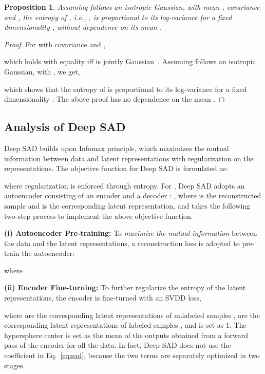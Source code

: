 \documentclass{bmvc2k}
\newtheorem{proposition}{Proposition}
\newtheorem{proof}{Proof}
\begin{document}
\begin{proposition}
Assuming  follows an isotropic Gaussian, with mean , covariance  and , the entropy of , \emph{i.e.}, , is proportional to its log-variance for a fixed dimensionality , without dependence on its mean .
\end{proposition}
\begin{proof}
For  with covariance  and ,

which holds with equality iff  is jointly Gaussian~\cite{cover2012elements}. Assuming  follows an isotropic Gaussian,  with , we get,

which shows that the entropy of  is proportional to its log-variance for a fixed dimensionality . The above proof has no dependence on the mean .
\end{proof}

\subsection{Analysis of Deep SAD}\label{sec32}
Deep SAD builds upon Infomax principle, which maximizes the mutual information  between data and latent representations with regularization on the representations. The objective function for Deep SAD is formulated as:

where regularization is enforced through entropy. For , Deep SAD adopts an autoencoder consisting of an encoder  and a decoder : ,
where  is the reconstructed sample and  is the corresponding latent representation, and takes the following two-step process to implement the above objective function.

\noindent\textbf{(i) Autoencoder Pre-training:} To \emph{maximize the mutual information} between the data and the latent representations, 
a reconstruction loss is adopted to pre-train the autoencoder:

where . 

\noindent\textbf{(ii) Encoder Fine-turning:} 
To further regularize the entropy of the latent representations, the encoder is fine-turned with an SVDD loss, 

where  are the corresponding latent representations of unlabeled samples ,  are the corresponding latent representations of labeled samples , and  is set as 1. The hypersphere center  is set as the mean of the outputs obtained from a forward pass of the encoder for all the data. In fact, Deep SAD does not use the coefficient  in Eq.~\eqref{eq:sad}, because the two terms are separately optimized in two stages.
\end{document}
